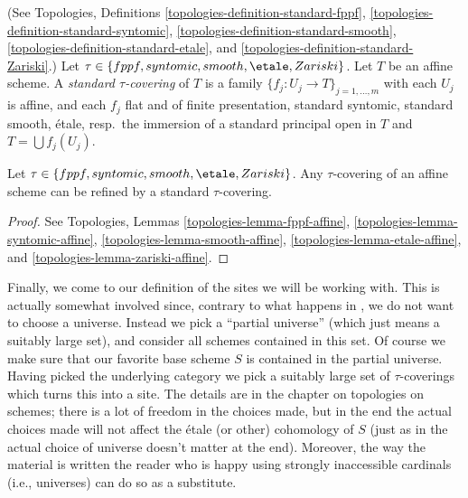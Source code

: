 \begin{definition}
\label{definition-standard-tau}
(See
Topologies, Definitions
\ref{topologies-definition-standard-fppf},
\ref{topologies-definition-standard-syntomic},
\ref{topologies-definition-standard-smooth},
\ref{topologies-definition-standard-etale}, and
\ref{topologies-definition-standard-Zariski}.)
Let $\tau \in \{fppf, syntomic, smooth, \etale, Zariski\}$.
Let $T$ be an affine scheme.
A {\it standard $\tau$-covering} of $T$ is a family
$\{f_j : U_j \to T\}_{j = 1, \ldots, m}$ with each $U_j$ is affine,
and each $f_j$ flat and of finite presentation,
standard syntomic, standard smooth, \'etale, resp.\ the immersion of a
standard principal open in $T$ and $T = \bigcup f_j(U_j)$.
\end{definition}

\begin{lemma}
\label{lemma-tau-affine}
Let $\tau \in \{fppf, syntomic, smooth, \etale, Zariski\}$.
Any $\tau$-covering of an affine scheme can be refined by a
standard $\tau$-covering.
\end{lemma}

\begin{proof}
See
Topologies, Lemmas
\ref{topologies-lemma-fppf-affine},
\ref{topologies-lemma-syntomic-affine},
\ref{topologies-lemma-smooth-affine},
\ref{topologies-lemma-etale-affine}, and
\ref{topologies-lemma-zariski-affine}.
\end{proof}

\noindent
Finally, we come to our definition of the sites we will be working with.
This is actually somewhat involved since, contrary to what happens in
\cite{SGA4}, we do not want to choose a universe. Instead we pick a ``partial
universe'' (which just means a suitably large set), and consider all schemes
contained in this set. Of course we make sure that our favorite base scheme
$S$ is contained in the partial universe. Having picked the underlying category
we pick a suitably large set of $\tau$-coverings which turns this into a site.
The details are in the chapter on topologies on schemes; there is a lot of
freedom in the choices made, but in the end the actual choices made will not
affect the \'etale (or other) cohomology of $S$ (just as in \cite{SGA4} the
actual choice of universe doesn't matter at the end). Moreover, the way the
material is written the reader who is happy using strongly inaccessible
cardinals (i.e., universes) can do so as a substitute.

